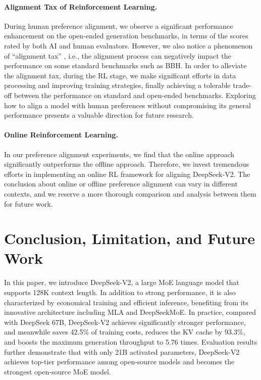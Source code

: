 \documentclass[11pt, a4paper, logo, copyright, nonumbering]{deepseek}
\newcommand{\dsvi}{DeepSeek 67B}
\newcommand{\dsvii}{DeepSeek-V2}
\newcommand{\dsattn}{MLA}
\newcommand{\dsmoe}{DeepSeekMoE}
\begin{document}
\begin{CJK*}{UTF8}{gbsn}
\paragraph{Alignment Tax of Reinforcement Learning.}
During human preference alignment, we observe a significant performance enhancement on the open-ended generation benchmarks, in terms of the scores rated by both AI and human evaluators. 
However, we also notice a phenomenon of ``alignment tax'' \citep{ouyang2022training}, i.e., the alignment process can negatively impact the performance on some standard benchmarks such as BBH. 
In order to alleviate the alignment tax, during the RL stage, we make significant efforts in data processing and improving training strategies, finally achieving a tolerable trade-off between the performance on standard and open-ended benchmarks. 
Exploring how to align a model with human preferences without compromising its general performance presents a valuable direction for future research.

\paragraph{Online Reinforcement Learning.}
In our preference alignment experiments, we find that the online approach significantly outperforms the offline approach. 
Therefore, we invest tremendous efforts in implementing an online RL framework for aligning \dsvii{}. 
The conclusion about online or offline preference alignment can vary in different contexts, and we reserve a more thorough comparison and analysis between them for future work.

\section{Conclusion, Limitation, and Future Work}
\label{sec:conclusion}

In this paper, we introduce \dsvii{}, a large MoE language model that supports 128K context length. 
In addition to strong performance, it is also characterized by economical training and efficient inference, benefiting from its innovative architecture including \dsattn{} and \dsmoe{}. 
In practice, compared with \dsvi{}, \dsvii{} achieves significantly stronger
performance, and meanwhile saves 42.5\% of training costs, reduces the KV cache by 93.3\%, and boosts the maximum generation throughput to 5.76 times. 
Evaluation results further demonstrate that with only 21B activated parameters, \dsvii{} achieves top-tier performance among open-source models and becomes the strongest open-source MoE model. 


\end{CJK*}
\end{document}
